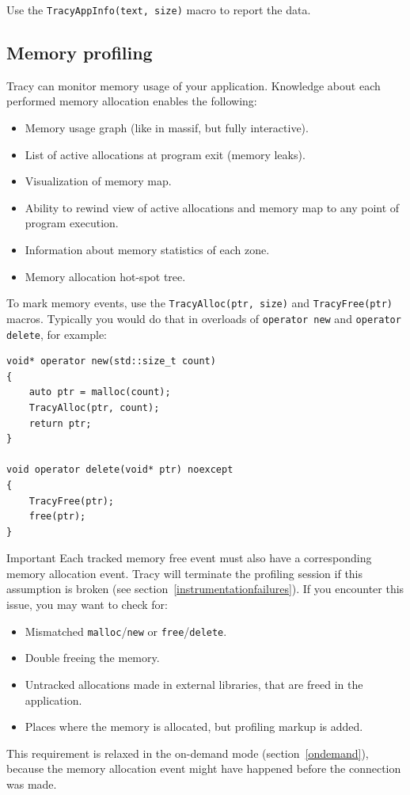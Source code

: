 \documentclass[hidelinks,titlepage,a4paper]{article}
\begin{document}
Use the \texttt{TracyAppInfo(text, size)} macro to report the data.

\subsection{Memory profiling}
\label{memoryprofiling}

Tracy can monitor memory usage of your application. Knowledge about each performed memory allocation enables the following:

\begin{itemize}
\item Memory usage graph (like in massif, but fully interactive).
\item List of active allocations at program exit (memory leaks).
\item Visualization of memory map.
\item Ability to rewind view of active allocations and memory map to any point of program execution.
\item Information about memory statistics of each zone.
\item Memory allocation hot-spot tree.
\end{itemize}

To mark memory events, use the \texttt{TracyAlloc(ptr, size)} and \texttt{TracyFree(ptr)} macros. Typically you would do that in overloads of \texttt{operator new} and \texttt{operator delete}, for example:

\begin{lstlisting}
void* operator new(std::size_t count)
{
    auto ptr = malloc(count);
    TracyAlloc(ptr, count);
    return ptr;
}

void operator delete(void* ptr) noexcept
{
    TracyFree(ptr);
    free(ptr);
}
\end{lstlisting}

\begin{bclogo}[
noborder=true,
couleur=black!5,
logo=\bcbombe
]{Important}
Each tracked memory free event must also have a corresponding memory allocation event. Tracy will terminate the profiling session if this assumption is broken (see section~\ref{instrumentationfailures}). If you encounter this issue, you may want to check for:

\begin{itemize}
\item Mismatched \texttt{malloc}/\texttt{new} or \texttt{free}/\texttt{delete}.
\item Double freeing the memory.
\item Untracked allocations made in external libraries, that are freed in the application.
\item Places where the memory is allocated, but profiling markup is added.
\end{itemize}

This requirement is relaxed in the on-demand mode (section~\ref{ondemand}), because the memory allocation event might have happened before the connection was made.
\end{bclogo}
\end{document}
